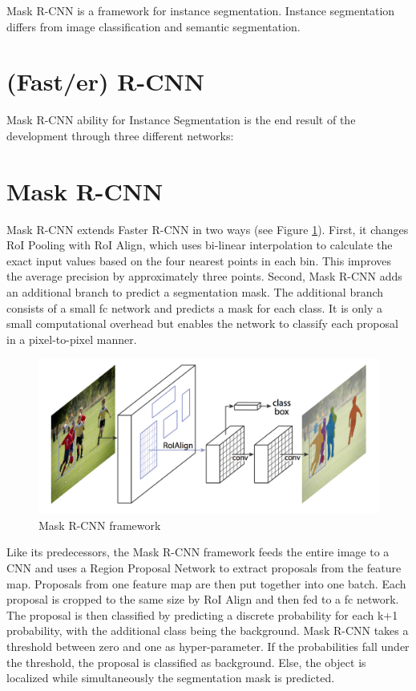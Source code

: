 Mask R-CNN is a framework for instance segmentation. Instance segmentation differs from image classification and semantic segmentation.



\section{ (Fast/er) R-CNN}
Mask R-CNN ability for Instance Segmentation  is the end result of the development through three different networks:



\section{ Mask  R-CNN} \label{MaskRCNN}

 Mask R-CNN \cite{He.op.2017} extends Faster R-CNN in two ways (see Figure \ref{fig:maskRcnnFramework}). First, it changes RoI Pooling with RoI Align, which uses bi-linear interpolation to calculate the exact input values based on the four nearest points in each bin. This improves the average precision by approximately three points. Second, Mask R-CNN adds an additional branch to predict a segmentation mask. The additional branch consists of a small \acl{fc} network and predicts a mask for each class. It is only a small computational overhead but enables the network to classify each proposal in a pixel-to-pixel manner. 

 \begin{figure}[!htbp]
 \centering
 \includegraphics[width=0.5\linewidth]{PICs/maskrcnn.png}
 \caption{Mask R-CNN framework}
 \label{fig:maskRcnnFramework}
 \end{figure}


Like its predecessors, the Mask R-CNN \cite{He.op.2017} framework feeds the entire image to a \ac{CNN} and uses a Region Proposal Network to extract proposals from the feature map. Proposals from one feature map are then put together into one batch. Each proposal is cropped to the same size by RoI Align and then fed to a \acl{fc} network. The proposal is then classified by predicting a discrete probability for each k+1 probability, with the additional class being the background. Mask R-CNN takes a threshold between zero and one as hyper-parameter. If the probabilities fall under the threshold, the proposal is classified as background. Else, the object is localized while simultaneously the segmentation mask is predicted. 

